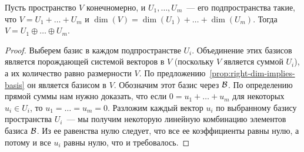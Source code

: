 \begin{proposition}
Пусть пространство $V$ конечномерно, и $U_1,\dots,U_m$~--- его
подпространства такие, что $V = U_1 + \dots + U_m$
и $\dim(V) = \dim(U_1) + \dots + \dim(U_m)$.
Тогда $V = U_1\oplus \dots \oplus U_m$.
\end{proposition}
\begin{proof}
Выберем базис в каждом подпространстве $U_i$. Объединение этих
базисов является порождающей системой векторов в $V$
(поскольку $V$ является суммой $U_i$), а их количество
равно размерности $V$. По предложению~\ref{prop:right-dim-implies-basis}
он является базисом в $V$. Обозначим этот базис через $\mathcal B$.
По определению прямой суммы нам нужно доказать, что если
$0 = u_1+\dots+u_m$ для некоторых $u_i\in U_i$, то $u_1=\dots=u_m=0$.
Разложим каждый вектор $u_i$ по выбранному базису пространства
$U_i$~--- мы получим некоторую линейную комбинацию элементов
базиса $\mathcal B$. Из ее равенства нулю следует, что все ее коэффициенты
равны нулю, а потому и все $u_i$ равны нулю, что и требовалось.
\end{proof}
